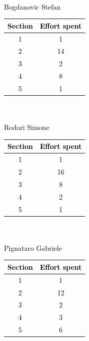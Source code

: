 \textcolor{Black}{
\\
Bogdanovic Stefan\\
\begin{tabular}[h]{|c|c|}
    \hline
    Section & Effort spent \\
    \hline
    1 & 1 \\
    \hline
    2 & 14 \\
    \hline
    3 & 2 \\
    \hline
    4 & 8 \\
    \hline
    5 & 1 \\
    \hline
\end{tabular}
\\ \\
Rodari Simone\\
\begin{tabular}[h]{|c|c|}
    \hline
    Section & Effort spent \\
    \hline
    1 & 1 \\
    \hline
    2 & 16 \\
    \hline
    3 & 8 \\
    \hline
    4 & 2 \\
    \hline
    5 & 1 \\
    \hline
\end{tabular}
\\ \\
Pignataro Gabriele\\
\begin{tabular}[h]{|c|c|}
    \hline
    Section & Effort spent \\
    \hline
    1 & 1 \\
    \hline
    2 & 12 \\
    \hline
    3 & 2 \\
    \hline
    4 & 3 \\
    \hline
    5 & 6 \\
    \hline
\end{tabular}
}